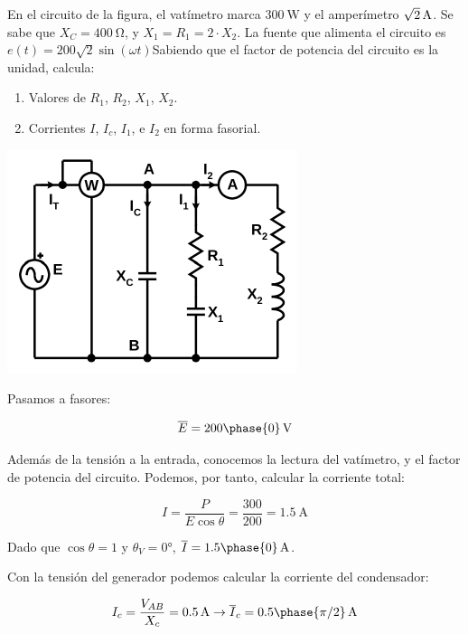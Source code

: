 \documentclass[12pt]{article}
\begin{document}


En el circuito de la figura, el vatímetro marca $\SI{300}{\watt}$ y el amperímetro $\SI[parse-numbers=false]{\sqrt{2}}{\ampere}$. Se sabe que $X_C = \SI{400}{\ohm}$, y $X_1 = R_1 = 2 \cdot X_2$. La fuente que alimenta el circuito es $e(t) = 200\sqrt{2} \sin(\omega t)$Sabiendo que el factor de potencia del circuito es la unidad, calcula:

\begin{enumerate}
\item Valores de $R_1$, $R_2$, $X_1$, $X_2$.
\item Corrientes $I$, $I_c$, $I_1$, e $I_2$ en forma fasorial. 
\end{enumerate}

\begin{center}
  \includegraphics{figs/problema11}
\end{center}


Pasamos a fasores:

\[
  \overline{E} = \SI[parse-numbers=false]{200\phase{0}}{\volt}
\]

Además de la tensión a la entrada, conocemos la lectura del vatímetro, y el factor de potencia del circuito. Podemos, por tanto, calcular la corriente total:

\[
I = \frac{P}{E \cos\theta} = \frac{300}{200} = \SI{1.5}{\ampere}
\]

Dado que $\cos\theta = 1$ y $\theta_V = \ang{0}$, $\overline{I} =  \SI[parse-numbers=false]{1.5\phase{0}}{\ampere}$.

Con la tensión del generador podemos calcular la corriente del condensador:

\[
  I_c = \frac{V_{AB}}{X_c} = \SI{0.5}{\ampere} \rightarrow  \overline{I}_c = \SI[parse-numbers=false]{0.5\phase{\pi/2}}{\ampere}
\]
\end{document}
